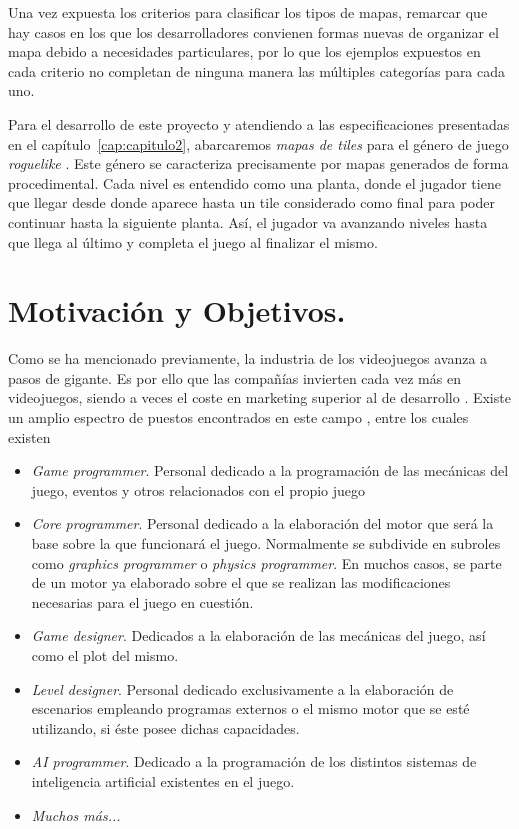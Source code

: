 Una vez expuesta los criterios para clasificar los tipos de mapas, remarcar que hay casos en los que los desarrolladores convienen formas nuevas de organizar el mapa debido a necesidades particulares, por lo que los ejemplos expuestos en cada criterio no completan de ninguna manera las múltiples categorías para cada uno.

Para el desarrollo de este proyecto y atendiendo a las especificaciones presentadas en el capítulo~\ref{cap:capitulo2}, abarcaremos \emph{mapas de tiles} para el género de juego \emph{roguelike} \cite{rlike}. Este género se caracteriza precisamente por mapas generados de forma procedimental. Cada nivel es entendido como una planta, donde el jugador tiene que llegar desde donde aparece hasta un tile considerado como final para poder continuar hasta la siguiente planta. Así, el jugador va avanzando niveles hasta que llega al último y completa el juego al finalizar el mismo.



\section*{Motivación y Objetivos.}

Como se ha mencionado previamente, la industria de los videojuegos avanza a pasos de gigante. Es por ello que las compañías invierten cada vez más en videojuegos, siendo a veces el coste en marketing superior al de desarrollo \cite{costgames}. Existe un amplio espectro de puestos encontrados en este campo \cite{gdroles1} \cite{gdroles2}, entre los cuales existen

\begin{itemize}
	\item \emph{Game programmer}. Personal dedicado a la programación de las mecánicas del juego, eventos y otros relacionados con el propio juego
	\item \emph{Core programmer}. Personal dedicado a la elaboración del motor que será la base sobre la que funcionará el juego. Normalmente se subdivide en subroles como \emph{graphics programmer} o \emph{physics programmer}. En muchos casos, se parte de un motor ya elaborado sobre el que se realizan las modificaciones necesarias para el juego en cuestión.
	\item \emph{Game designer}. Dedicados a la elaboración de las mecánicas del juego, así como el plot del mismo.
	\item \emph{Level designer}. Personal dedicado exclusivamente a la elaboración de escenarios empleando programas externos o el mismo motor que se esté utilizando, si éste posee dichas capacidades.
	\item \emph{AI programmer}. Dedicado a la programación de los distintos sistemas de inteligencia artificial existentes en el juego.
	\item \emph{Muchos más...}
\end{itemize}

